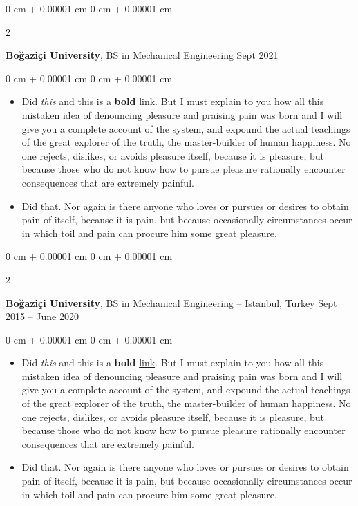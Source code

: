 \documentclass[10pt, letterpaper]{article}
\newenvironment{highlights}{
    \begin{itemize}[
        topsep=0.10 cm,
        parsep=0.10 cm,
        partopsep=0pt,
        itemsep=0pt,
        leftmargin=0 cm + 10pt
    ]
}{
    \end{itemize}
} %
\newenvironment{onecolentry}{
    \begin{adjustwidth}{
        0 cm + 0.00001 cm
    }{
        0 cm + 0.00001 cm
    }
}{
    \end{adjustwidth}
} %
\newenvironment{twocolentry}[2][]{
    \onecolentry
    \def\secondColumn{#2}
    \setcolumnwidth{\fill, 4.5 cm}
    \begin{paracol}{2}
}{
    \switchcolumn \raggedleft \secondColumn
    \end{paracol}
    \endonecolentry
} %
\begin{document}
        \vspace{0.2 cm}

        \begin{twocolentry}{
            Sept 2021
        }
            \textbf{Boğaziçi University}, BS in Mechanical Engineering\end{twocolentry}

        \vspace{0.10 cm}
        \begin{onecolentry}
            \begin{highlights}
                \item Did \textit{this} and this is a \textbf{bold} \href{https://example.com}{link}. But I must explain to you how all this mistaken idea of denouncing pleasure and praising pain was born and I will give you a complete account of the system, and expound the actual teachings of the great explorer of the truth, the master-builder of human happiness. No one rejects, dislikes, or avoids pleasure itself, because it is pleasure, but because those who do not know how to pursue pleasure rationally encounter consequences that are extremely painful.
                \item Did that. Nor again is there anyone who loves or pursues or desires to obtain pain of itself, because it is pain, but because occasionally circumstances occur in which toil and pain can procure him some great pleasure.
            \end{highlights}
        \end{onecolentry}


        \vspace{0.2 cm}

        \begin{twocolentry}{
            Sept 2015 – June 2020
        }
            \textbf{Boğaziçi University}, BS in Mechanical Engineering -- Istanbul, Turkey\end{twocolentry}

        \vspace{0.10 cm}
        \begin{onecolentry}
            \begin{highlights}
                \item Did \textit{this} and this is a \textbf{bold} \href{https://example.com}{link}. But I must explain to you how all this mistaken idea of denouncing pleasure and praising pain was born and I will give you a complete account of the system, and expound the actual teachings of the great explorer of the truth, the master-builder of human happiness. No one rejects, dislikes, or avoids pleasure itself, because it is pleasure, but because those who do not know how to pursue pleasure rationally encounter consequences that are extremely painful.
                \item Did that. Nor again is there anyone who loves or pursues or desires to obtain pain of itself, because it is pain, but because occasionally circumstances occur in which toil and pain can procure him some great pleasure.
            \end{highlights}
        \end{onecolentry}
\end{document}
